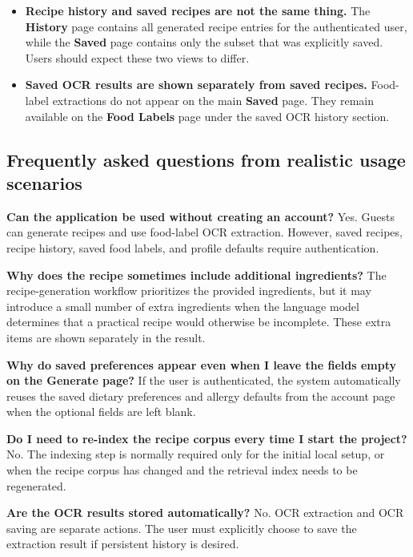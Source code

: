 \begin{itemize}
	even if no thumbnail image is attached. When image generation is
	unavailable, the system returns the recipe itself and treats the
	missing thumbnail as a secondary issue.
	\item \textbf{Recipe history and saved recipes are not the same
	thing.} The \textbf{History} page contains all generated recipe
	entries for the authenticated user, while the \textbf{Saved} page
	contains only the subset that was explicitly saved. Users should
	expect these two views to differ.
	\item \textbf{Saved OCR results are shown separately from saved
	recipes.} Food-label extractions do not appear on the main
	\textbf{Saved} page. They remain available on the \textbf{Food
	Labels} page under the saved OCR history section.
\end{itemize}

\subsection{Frequently asked questions from realistic usage scenarios}

\textbf{Can the application be used without creating an account?}
Yes. Guests can generate recipes and use food-label OCR extraction.
However, saved recipes, recipe history, saved food labels, and profile
defaults require authentication.

\textbf{Why does the recipe sometimes include additional ingredients?}
The recipe-generation workflow prioritizes the provided ingredients,
but it may introduce a small number of extra ingredients when the
language model determines that a practical recipe would otherwise be
incomplete. These extra items are shown separately in the result.

\textbf{Why do saved preferences appear even when I leave the fields
empty on the Generate page?}
If the user is authenticated, the system automatically reuses the
saved dietary preferences and allergy defaults from the account page
when the optional fields are left blank.

\textbf{Do I need to re-index the recipe corpus every time I start the
project?}
No. The indexing step is normally required only for the initial local
setup, or when the recipe corpus has changed and the retrieval index
needs to be regenerated.

\textbf{Are the OCR results stored automatically?}
No. OCR extraction and OCR saving are separate actions. The user must
explicitly choose to save the extraction result if persistent history
is desired.

